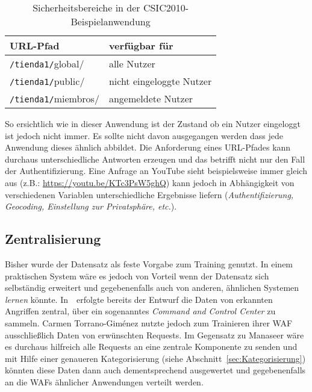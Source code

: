 \begin{table}[ht]
  \centering
  \begin{tabular}{lp{7cm}}
    \toprule
    \textbf{URL-Pfad} & \textbf{verfügbar für} \\
    \midrule
    \verb=/tienda1/=\textcolor{bhtBlue}{global}/ & alle Nutzer\\
    \verb=/tienda1/=\textcolor{bhtBlue}{public}/ & nicht eingeloggte Nutzer  \\ 
    \verb=/tienda1/=\textcolor{bhtBlue}{miembros}/ & angemeldete Nutzer  \\
    \bottomrule
  \end{tabular}
  
  \caption{Sicherheitsbereiche in der CSIC2010-Beispielanwendung}
  \label{tab:csicsecarea}
\end{table}

So ersichtlich wie in dieser Anwendung ist der Zustand ob ein Nutzer eingeloggt ist jedoch nicht immer. Es sollte nicht davon ausgegangen werden dass jede Anwendung dieses ähnlich abbildet. Die Anforderung eines URL-Pfades kann durchaus unterschiedliche Antworten erzeugen und das betrifft nicht nur den Fall der Authentifizierung. Eine Anfrage an YouTube sieht beispielsweise immer gleich aus (z.B.: \url{https://youtu.be/KTc3PsW5ghQ}) kann jedoch in Abhängigkeit von verschiedenen Variablen unterschiedliche Ergebnisse liefern (\emph{Authentifizierung, Geocoding, Einstellung zur Privatsphäre, etc.}).




\subsection{Zentralisierung}
\label{sec:zentralisierungkern}

Bisher wurde der Datensatz als feste Vorgabe zum Training genutzt. In einem praktischen System wäre es jedoch von Vorteil wenn der Datensatz sich selbständig erweitert und gegebenenfalls auch von anderen, ähnlichen Systemen \glqq\emph{lernen}\grqq{} könnte. In~\cite{Manaseer2018}~erfolgte bereits der Entwurf die Daten von erkannten Angriffen zentral, über ein sogenanntes \emph{Command and Control Center} zu sammeln. Carmen Torrano-Giménez nutzte jedoch zum Trainieren ihrer WAF ausschließlich Daten von erwünschten Requests. Im Gegensatz zu Manaseer wäre es durchaus hilfreich alle Requests an eine zentrale Komponente zu senden und mit Hilfe einer genaueren Kategorisierung (siehe Abschnitt~\ref{sec:Kategorisierung}) könnten diese Daten dann auch dementsprechend ausgewertet und gegebenenfalls an die WAFs ähnlicher Anwendungen verteilt werden.



